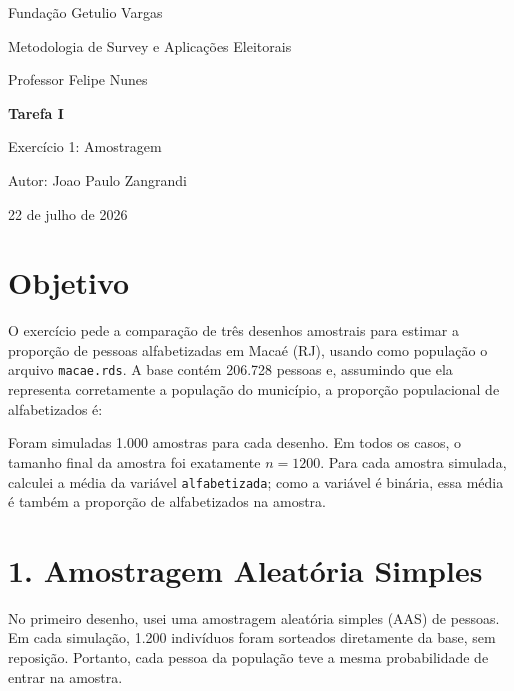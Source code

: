 \documentclass[11pt,a4paper]{article}
\begin{document}
\begin{titlepage}
\vspace*{2cm}
{\Large Fundação Getulio Vargas\par}
\vspace{0.4cm}
{\Large Metodologia de Survey e Aplicações Eleitorais\par}
\vspace{0.4cm}
{\large Professor Felipe Nunes\par}
\vfill
{\color{azul}\Huge\bfseries Tarefa I\par}
\vspace{0.3cm}
{\color{azul}\LARGE Exercício 1: Amostragem\par}
\vfill
{\large Autor: Joao Paulo Zangrandi\par}
{\large 22 de julho de 2026\par}
\end{titlepage}

\section*{Objetivo}

O exercício pede a comparação de três desenhos amostrais para estimar a proporção de pessoas alfabetizadas em Macaé (RJ), usando como população o arquivo \texttt{macae.rds}. A base contém 206.728 pessoas e, assumindo que ela representa corretamente a população do município, a proporção populacional de alfabetizados é:

\begin{center}
\end{center}

Foram simuladas 1.000 amostras para cada desenho. Em todos os casos, o tamanho final da amostra foi exatamente \(n = 1200\). Para cada amostra simulada, calculei a média da variável \texttt{alfabetizada}; como a variável é binária, essa média é também a proporção de alfabetizados na amostra.

\section*{1. Amostragem Aleatória Simples}

No primeiro desenho, usei uma amostragem aleatória simples (AAS) de pessoas. Em cada simulação, 1.200 indivíduos foram sorteados diretamente da base, sem reposição. Portanto, cada pessoa da população teve a mesma probabilidade de entrar na amostra.
\end{document}
